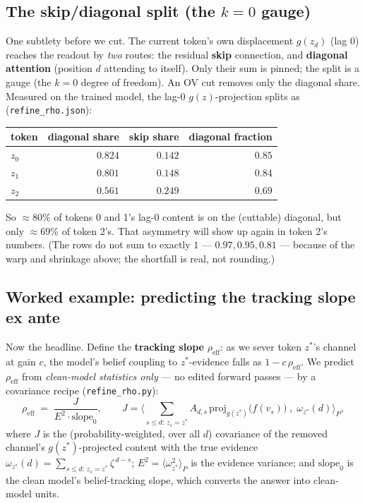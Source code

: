 \documentclass[11pt]{article}
\newcommand{\pzeta}{\zeta}
\newcommand{\gv}[1]{g(#1)}
\newcommand{\proj}{\mathrm{proj}}
\begin{document}
\subsection{The skip/diagonal split (the \texorpdfstring{$k{=}0$}{k=0} gauge)}

One subtlety before we cut. The current token's own displacement $\gv{z_d}$
(lag 0) reaches the readout by \emph{two} routes: the residual \textbf{skip}
connection, and \textbf{diagonal attention} (position $d$ attending to itself).
Only their sum is pinned; the split is a gauge (the $k{=}0$ degree of freedom).
An OV cut removes only the diagonal share. Measured on the trained model, the
lag-0 $\gv{z}$-projection splits as (\texttt{refine\_rho.json}):
\begin{center}
\begin{tabular}{lrrr}
\toprule
token & diagonal share & skip share & diagonal fraction \\
\midrule
$z_0$ & $0.824$ & $0.142$ & $0.85$ \\
$z_1$ & $0.801$ & $0.148$ & $0.84$ \\
$z_2$ & $0.561$ & $0.249$ & $0.69$ \\
\bottomrule
\end{tabular}
\end{center}
So $\approx 80\%$ of tokens 0 and 1's lag-0 content is on the (cuttable)
diagonal, but only $\approx 69\%$ of token 2's. That asymmetry will show up
again in token 2's numbers. (The rows do not sum to exactly $1$ --- $0.97,
0.95, 0.81$ --- because of the warp and shrinkage above; the shortfall is real,
not rounding.)

\subsection{Worked example: predicting the tracking slope ex ante}\label{sec:rho}

Now the headline. Define the \textbf{tracking slope} $\rho_{\mathrm{eff}}$: as
we sever token $z^*$'s channel at gain $c$, the model's belief coupling to
$z^*$-evidence falls as $1-c\,\rho_{\mathrm{eff}}$. We predict
$\rho_{\mathrm{eff}}$ from \emph{clean-model statistics only} --- no edited
forward passes --- by a covariance recipe (\texttt{refine\_rho.py}):
\[
  \rho_{\mathrm{eff}}\;=\;\frac{J}{E^2\cdot \text{slope}_0},
  \qquad
  J=\Big\langle\!\!\sum_{s\le d:\,z_s=z^*}\!\! A_{d,s}\,\proj_{\gv{z^*}}\!\big(f(v_s)\big)\;,\;\omega_{z^*}(d)\Big\rangle_{\!P},
\]
where $J$ is the (probability-weighted, over all $d$) covariance of the removed
channel's $\gv{z^*}$-projected content with the true evidence
$\omega_{z^*}(d)=\sum_{s\le d:\,z_s=z^*}\pzeta^{\,d-s}$; $E^2=\langle
\omega_{z^*}^2\rangle_P$ is the evidence variance; and $\text{slope}_0$ is the
clean model's belief-tracking slope, which converts the answer into clean-model
units.
\end{document}
